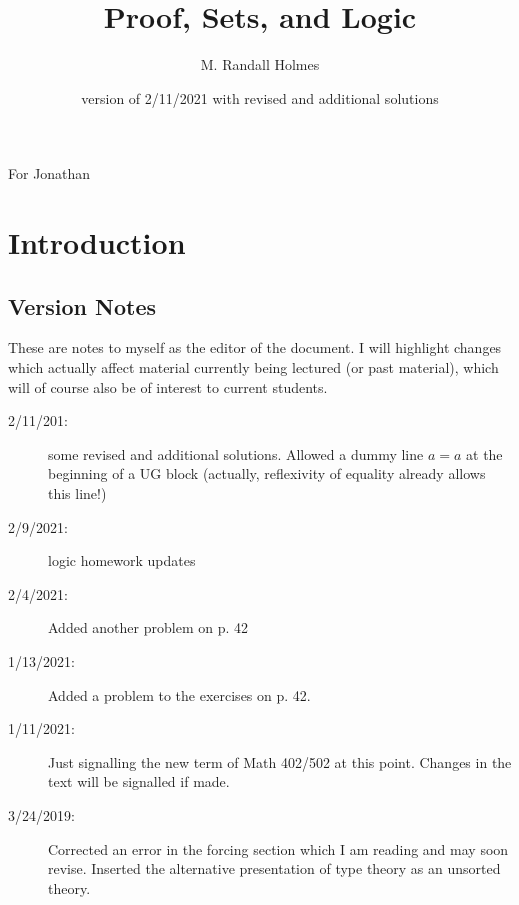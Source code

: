 \documentclass[12pt]{book}
\title{Proof, Sets, and Logic}
\author{M. Randall Holmes}
\date{version of 2/11/2021 with revised and additional solutions}
\begin{document}
\maketitle

\newpage

\begin{centering}
For Jonathan\\
\end{centering}

\newpage

\tableofcontents

\newpage

\section{Introduction}

{\tiny

\subsection{Version Notes}

These are notes to myself as the editor of the document.  I will
highlight changes which actually affect material currently being
lectured (or past material), which will of course also be of interest
to current students.

\begin{description}

\item[2/11/201:]  some revised and additional solutions.  Allowed a dummy line $a=a$ at the beginning of a UG block (actually, reflexivity of equality already allows this line!)

\item[2/9/2021:]  logic homework updates

\item[2/4/2021:]  Added another problem on p. 42

\item[1/13/2021:]  Added a problem to the exercises on p. 42.

\item[1/11/2021:]  Just signalling the new term of Math 402/502 at this point.  Changes in the text will be signalled if made.

\item[3/24/2019:]  Corrected an error in the forcing section which I am reading and may soon revise.  Inserted the alternative presentation of type theory as an unsorted theory.


\end{description}}
\end{document}
